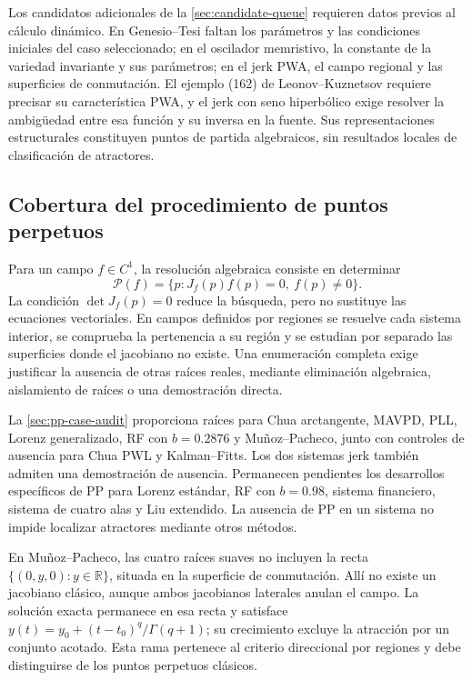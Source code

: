 Los candidatos adicionales de la \cref{sec:candidate-queue} requieren datos
previos al cálculo dinámico. En Genesio--Tesi faltan los parámetros y las
condiciones iniciales del caso seleccionado; en el oscilador memristivo, la
constante de la variedad invariante y sus parámetros; en el jerk PWA, el
campo regional y las superficies de conmutación. El ejemplo (162) de
Leonov--Kuznetsov requiere precisar su característica PWA, y el jerk con seno
hiperbólico exige resolver la ambigüedad entre esa función y su inversa en la
fuente. Sus representaciones estructurales constituyen puntos de partida
algebraicos, sin resultados locales de clasificación de atractores.

\subsection{Cobertura del procedimiento de puntos perpetuos}

Para un campo \(f\in C^1\), la resolución algebraica consiste en determinar
\[
 \mathcal P(f)=\{p:J_f(p)f(p)=0,\ f(p)\ne0\}.
\]
La condición \(\det J_f(p)=0\) reduce la búsqueda, pero no sustituye las
ecuaciones vectoriales. En campos definidos por regiones se resuelve cada
sistema interior, se comprueba la pertenencia a su región y se estudian por
separado las superficies donde el jacobiano no existe. Una enumeración
completa exige justificar la ausencia de otras raíces reales, mediante
eliminación algebraica, aislamiento de raíces o una demostración directa.

La \cref{sec:pp-case-audit} proporciona raíces para Chua arctangente, MAVPD,
PLL, Lorenz generalizado, RF con \(b=0.2876\) y Muñoz--Pacheco, junto con
controles de ausencia para Chua PWL y Kalman--Fitts. Los dos sistemas jerk
también admiten una demostración de ausencia. Permanecen pendientes los
desarrollos específicos de PP para Lorenz estándar, RF con \(b=0.98\),
sistema financiero, sistema de cuatro alas y Liu extendido. La ausencia de PP
en un sistema no impide localizar atractores mediante otros métodos.

En Muñoz--Pacheco, las cuatro raíces suaves no incluyen la recta
\(\{(0,y,0):y\in\mathbb R\}\), situada en la superficie de conmutación.
Allí no existe un jacobiano clásico, aunque ambos jacobianos laterales
anulan el campo. La solución exacta permanece en esa recta y satisface
\(y(t)=y_0+(t-t_0)^q/\Gamma(q+1)\); su crecimiento excluye la atracción
por un conjunto acotado. Esta rama pertenece al criterio direccional por
regiones y debe distinguirse de los puntos perpetuos clásicos.


